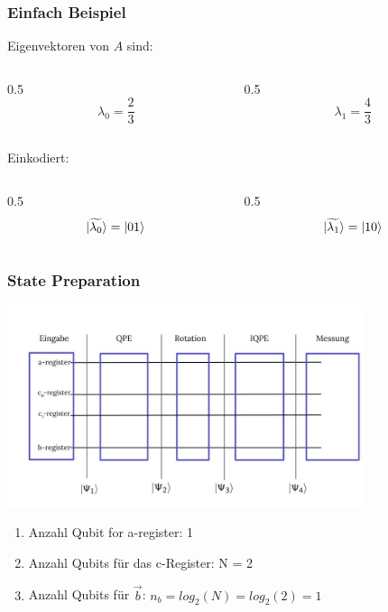 \begin{frame}
    \frametitle{Einfach Beispiel}

    Eigenvektoren von $A$ sind:    
    \begin{columns}[c]
        \begin{column}{0.5\hsize}\centering
            $$\lambda_0 = \frac{2}{3}$$
        \end{column}

        \begin{column}{0.5\hsize}
            $$\lambda_1 = \frac{4}{3}$$
        \end{column}
    \end{columns}

    \hfil

    \hfil

    Einkodiert:
    \begin{columns}[c]
        \begin{column}{0.5\hsize}\centering
            $$\ket{\widetilde{\lambda_0}} = \ket{01}$$
        \end{column}

        \begin{column}{0.5\hsize}
            $$\ket{\widetilde{\lambda_1}} = \ket{10}$$
        \end{column}
    \end{columns}



    \hfil

\end{frame}


\begin{frame}
    \frametitle{State Preparation}

    \begin{center}
    \includegraphics[width=10.5cm]{img/example_circuit/example_circuit.jpg}
    \end{center}

    \begin{enumerate}
        \item Anzahl Qubit for a-register: 1
        \item Anzahl Qubits für das c-Register: N = 2
        \item Anzahl Qubits für $\vec{b}$: $n_b = log_2(N) = log_2 (2) = 1$ 
    \end{enumerate}

\end{frame}

